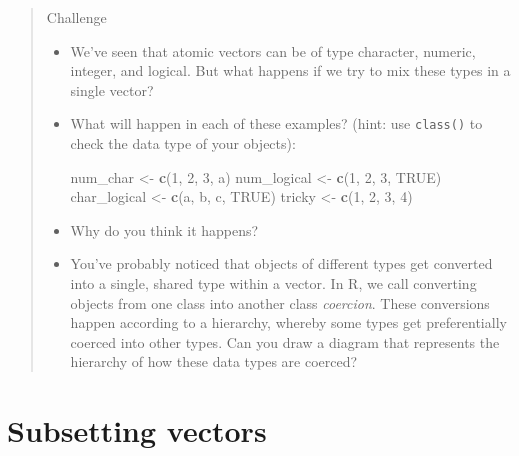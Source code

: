 \documentclass[
]{book}
\newenvironment{Shaded}{\begin{snugshade}}{\end{snugshade}}
\newcommand{\ConstantTok}[1]{\textcolor[rgb]{0.56,0.35,0.01}{#1}}
\newcommand{\DecValTok}[1]{\textcolor[rgb]{0.00,0.00,0.81}{#1}}
\newcommand{\FunctionTok}[1]{\textcolor[rgb]{0.13,0.29,0.53}{\textbf{#1}}}
\newcommand{\NormalTok}[1]{#1}
\newcommand{\OtherTok}[1]{\textcolor[rgb]{0.56,0.35,0.01}{#1}}
\newcommand{\StringTok}[1]{\textcolor[rgb]{0.31,0.60,0.02}{#1}}
\providecommand{\tightlist}{%
  \setlength{\itemsep}{0pt}\setlength{\parskip}{0pt}}
\begin{document}
\begin{quote}
Challenge

\begin{itemize}
\tightlist
\item
  We've seen that atomic vectors can be of type character,
  numeric, integer, and logical. But what happens if we try to mix these types in
  a single vector?
\end{itemize}

\begin{itemize}
\item
  What will happen in each of these examples? (hint: use \texttt{class()}
  to check the data type of your objects):

\begin{Shaded}
\begin{Highlighting}[]
\NormalTok{num\_char }\OtherTok{\textless{}{-}} \FunctionTok{c}\NormalTok{(}\DecValTok{1}\NormalTok{, }\DecValTok{2}\NormalTok{, }\DecValTok{3}\NormalTok{, }\StringTok{\textquotesingle{}a\textquotesingle{}}\NormalTok{)}
\NormalTok{num\_logical }\OtherTok{\textless{}{-}} \FunctionTok{c}\NormalTok{(}\DecValTok{1}\NormalTok{, }\DecValTok{2}\NormalTok{, }\DecValTok{3}\NormalTok{, }\ConstantTok{TRUE}\NormalTok{)}
\NormalTok{char\_logical }\OtherTok{\textless{}{-}} \FunctionTok{c}\NormalTok{(}\StringTok{\textquotesingle{}a\textquotesingle{}}\NormalTok{, }\StringTok{\textquotesingle{}b\textquotesingle{}}\NormalTok{, }\StringTok{\textquotesingle{}c\textquotesingle{}}\NormalTok{, }\ConstantTok{TRUE}\NormalTok{)}
\NormalTok{tricky }\OtherTok{\textless{}{-}} \FunctionTok{c}\NormalTok{(}\DecValTok{1}\NormalTok{, }\DecValTok{2}\NormalTok{, }\DecValTok{3}\NormalTok{, }\StringTok{\textquotesingle{}4\textquotesingle{}}\NormalTok{)}
\end{Highlighting}
\end{Shaded}
\item
  Why do you think it happens?
\item
  You've probably noticed that objects of different types get
  converted into a single, shared type within a vector. In R, we
  call converting objects from one class into another class
  \emph{coercion}. These conversions happen according to a hierarchy,
  whereby some types get preferentially coerced into other
  types. Can you draw a diagram that represents the hierarchy of how
  these data types are coerced?
\end{itemize}
\end{quote}

\hypertarget{subsetting-vectors}{%
\section{Subsetting vectors}\label{subsetting-vectors}}
\end{document}
